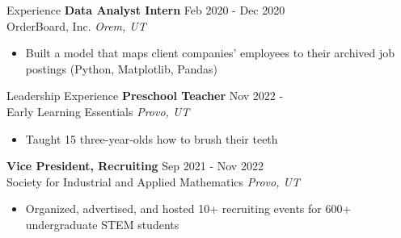 \documentclass{resume} %
\begin{document}
\begin{rSection}{Experience}
\textbf{Data Analyst Intern} \hfill Feb 2020 - Dec 2020\\
OrderBoard, Inc. \hfill \textit{Orem, UT}
 \begin{itemize}
    \itemsep -2pt {} 
    \item Built a model that maps client companies’ employees to their archived job postings 
    (Python, Matplotlib, Pandas)
 \end{itemize}

\end{rSection} 

\begin{rSection}{Leadership Experience} 
\textbf{Preschool Teacher} \hfill Nov 2022 - \\
Early Learning Essentials \hfill \textit{Provo, UT}
   \begin{itemize}
      \itemsep -2pt {} 
      \item Taught 15 three-year-olds how to brush their teeth
   \end{itemize}

\textbf{Vice President, Recruiting} \hfill Sep 2021 - Nov 2022 \\
Society for Industrial and Applied Mathematics \hfill \textit{Provo, UT}
   \begin{itemize}
      \itemsep -2pt {} 
      \item Organized, advertised, and hosted 10+ recruiting events for 600+ undergraduate STEM 
      students
   \end{itemize}

\end{rSection}
\end{document}
